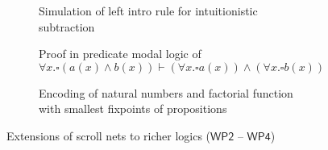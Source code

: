 \documentclass[12pt,draftproposal]{msca-pf}
\newcommand{\WP}[1]{$\mathsf{WP#1}$}
\begin{document}
\begin{figure}
  \captionsetup[subfigure]{justification=centering}
  \centering
  \begin{subfigure}[b]{0.55\textwidth}
    \caption{Simulation of left intro rule for intuitionistic subtraction}
    \label{fig:subtraction}
  \end{subfigure}
  \begin{subfigure}[b]{0.44\textwidth}
    \caption{Proof in predicate modal logic of $\forall x. \square (a(x) \land b(x)) \vdash (\forall x. \square a(x)) \land (\forall x. \square b(x))$}
    \label{fig:modal}
  \end{subfigure}
  \begin{subfigure}[b]{\textwidth}
    \caption{Encoding of natural numbers and factorial function with smallest fixpoints of propositions}
    \label{fig:factorial}
  \end{subfigure}
  \caption{Extensions of scroll nets to richer logics (\WP{2} -- \WP{4})}
  \label{fig:extensions}
\end{figure}
\end{document}
